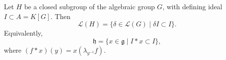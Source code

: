 Let $H$ be a closed subgroup of the algebraic group $G$, with defining ideal $I \subset A = K[G]$. Then
$$\mathcal{L}(H) = \{\delta \in \mathcal{L}(G) \mid \delta I \subset I\}.$$
Equivalently,
$$\mathfrak{h} = \{x \in \mathfrak{g} \mid I * x \subset I\},$$
where $(f * x)(y) = x(\lambda_{y^{-1}} f)$.
